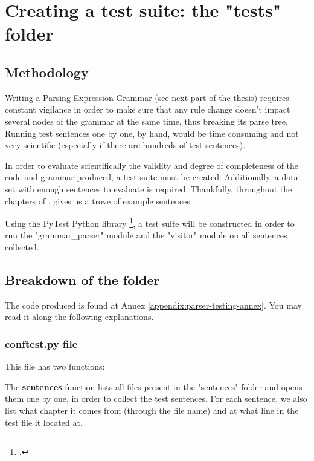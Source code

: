 \chapter{Creating a test suite: the "tests" folder}
\label{chap:creating_a_test_suite}

\section{Methodology}

Writing a Parsing Expression Grammar (see next part of the thesis) requires constant vigilance in order to make sure
that any rule change doesn't impact several nodes of the grammar at the same time, thus breaking its parse tree. Running test
sentences one by one, by hand, would be time consuming and not very scientific (especially if there are hundreds of test sentences).\newline

In order to evaluate scientifically the validity and degree of completeness of the code and grammar produced, a test suite must be created.
Additionally, a data set with enough sentences to evaluate is required. Thankfully, throughout the chapters of ,
\citeauthor{cowan1997complete} gives us a trove of example sentences.\newline

Using the PyTest Python library \footcite{pytest8.3.2}, a test suite will be constructed in order to run the "grammar\_parser" module
and the "visitor" module on all sentences collected.

\section{Breakdown of the folder}

The code produced is found at Annex \ref{appendix:parser-testing-annex}. You may read it along the following explanations.

\newpage

\subsection*{conftest.py file}

This file has two functions: \newline

The \textbf{sentences} function lists all files present in the "sentences" folder and opens them one by one,
in order to collect the test sentences. For each sentence, we also list what chapter it comes from (through the file name) and
at what line in the test file it located at.\newline

